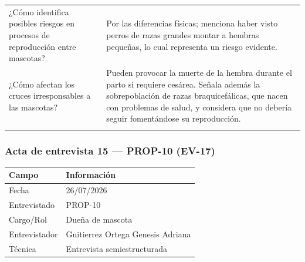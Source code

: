 \documentclass[journal,onecolumn]{IEEEtran}
\begin{document}
{\begin{longtable}{@{}p{5.6cm} p{9.4cm}@{}}
			¿Cómo identifica posibles riesgos en procesos de reproducción entre mascotas? & Por las diferencias físicas; menciona haber visto perros de razas grandes montar a hembras pequeñas, lo cual representa un riesgo evidente. \\ \addlinespace
			
			¿Cómo afectan los cruces irresponsables a las mascotas? & Pueden provocar la muerte de la hembra durante el parto si requiere cesárea. Señala además la sobrepoblación de razas braquicefálicas, que nacen con problemas de salud, y considera que no debería seguir fomentándose su reproducción. \\ \addlinespace
			
		\end{longtable}
	}
	
	
	\subsubsection*{Acta de entrevista 15 --- PROP-10 (EV-17)}
	
	\begin{table}[H]
		\centering\small
		\begin{tabularx}{\textwidth}{@{}l X@{}}
			\toprule
			\textbf{Campo} & \textbf{Información} \\
			\midrule
			
			Fecha & 26/07/2026 \\
			
			Entrevistado & PROP-10 \\
			
			Cargo/Rol & Dueña de mascota \\
			
			Entrevistador & Guitierrez Ortega Genesis Adriana \\
			
			Técnica & Entrevista semiestructurada \\
			
			\bottomrule
		\end{tabularx}
	\end{table}
	
\end{document}
